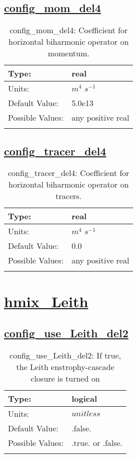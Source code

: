 \subsection[config\_mom\_del4]{\hyperref[sec:nm_tab_hmix_del4]{config\_mom\_del4}}
\label{subsec:nm_sec_config_mom_del4}
\begin{center}
\begin{longtable}{| p{2.0in} | p{4.0in} |}
    \hline
    Type: & real \\
    \hline
    Units: & $m^4$ $s^{-1}$ \\
    \hline
    Default Value: & 5.0e13 \\
    \hline
    Possible Values: & any positive real \\
    \hline
    \caption{config\_mom\_del4: Coefficient for horizontal biharmonic operator on momentum.}
\end{longtable}
\end{center}
\subsection[config\_tracer\_del4]{\hyperref[sec:nm_tab_hmix_del4]{config\_tracer\_del4}}
\label{subsec:nm_sec_config_tracer_del4}
\begin{center}
\begin{longtable}{| p{2.0in} | p{4.0in} |}
    \hline
    Type: & real \\
    \hline
    Units: & $m^4$ $s^{-1}$ \\
    \hline
    Default Value: & 0.0 \\
    \hline
    Possible Values: & any positive real \\
    \hline
    \caption{config\_tracer\_del4: Coefficient for horizontal biharmonic operator on tracers.}
\end{longtable}
\end{center}
\section[hmix\_Leith]{\hyperref[sec:nm_tab_hmix_Leith]{hmix\_Leith}}
\label{sec:nm_sec_hmix_Leith}
\subsection[config\_use\_Leith\_del2]{\hyperref[sec:nm_tab_hmix_Leith]{config\_use\_Leith\_del2}}
\label{subsec:nm_sec_config_use_Leith_del2}
\begin{center}
\begin{longtable}{| p{2.0in} | p{4.0in} |}
    \hline
    Type: & logical \\
    \hline
    Units: & $unitless$ \\
    \hline
    Default Value: & .false. \\
    \hline
    Possible Values: & .true. or .false. \\
    \hline
    \caption{config\_use\_Leith\_del2: If true, the Leith enstrophy-cascade closure is turned on}
\end{longtable}
\end{center}
